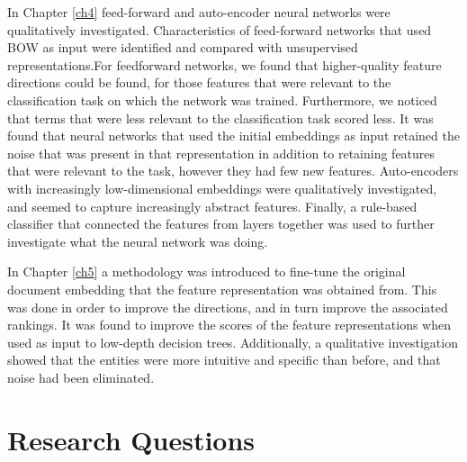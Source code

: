 In Chapter \ref{ch4} feed-forward and auto-encoder neural networks were qualitatively investigated. Characteristics of feed-forward networks that used BOW as input were identified and compared with unsupervised representations.For feedforward networks, we found that higher-quality feature directions could be found, for those features that were relevant to the classification task on which the network was trained. Furthermore, we noticed that terms that were less relevant to the classification task scored less. It was found that neural networks that used the initial embeddings as input retained the noise that was present in that representation in addition to retaining features that were relevant to the task, however they had few new features. Auto-encoders with increasingly low-dimensional embeddings were qualitatively investigated, and seemed to capture increasingly abstract features. Finally,  a rule-based classifier that connected the features from layers together was used to further investigate what the neural network was doing. %

In Chapter \ref{ch5} a methodology was introduced to fine-tune the original document embedding that the feature representation was obtained from. This was done in order to improve the directions, and in turn improve the associated rankings. It was found to improve the scores of the feature representations when used as input to low-depth decision trees. Additionally, a qualitative investigation showed that the entities were more intuitive and specific than before, and that noise had been eliminated.






\section{Research Questions}

